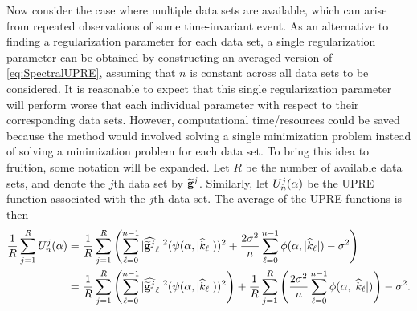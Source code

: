 Now consider the case where multiple data sets are available, which can arise from repeated observations of some time-invariant event. As an alternative to finding a regularization parameter for each data set, a single regularization parameter can be obtained by constructing an averaged version of \eqref{eq:SpectralUPRE}, assuming that $n$ is constant across all data sets to be considered. It is reasonable to expect that this single regularization parameter will perform worse that each individual parameter with respect to their corresponding data sets. However, computational time/resources could be saved because the method would involved solving a single minimization problem instead of solving a minimization problem for each data set. To bring this idea to fruition, some notation will be expanded. Let $R$ be the number of available data sets, and denote the $j$th data set by $\widetilde{\mathbf{g}}^j$. Similarly, let $U_n^j(\alpha)$ be the UPRE function associated with the $j$th data set.  The average of the UPRE functions is then 
\begin{align*}
\frac{1}{R}\sum_{j=1}^R U_n^j(\alpha) &= \frac{1}{R}\sum_{j=1}^R \left(\sum_{\ell = 0}^{n-1} |\widehat{\widetilde{\mathbf{g}}^j}_\ell|^2(\psi(\alpha,|\widehat{k}_\ell|))^2 + \frac{2\sigma^2}{n}\sum_{\ell = 0}^{n-1} \phi(\alpha,|\widehat{k}_\ell|) - \sigma^2\right) \\
&= \frac{1}{R}\sum_{j=1}^R \left(\sum_{\ell = 0}^{n-1} |\widehat{\widetilde{\mathbf{g}}^j}_\ell|^2(\psi(\alpha,|\widehat{k}_\ell|))^2\right) + \frac{1}{R}\sum_{j=1}^R \left(\frac{2\sigma^2}{n}\sum_{\ell = 0}^{n-1} \phi(\alpha,|\widehat{k}_\ell|)\right) - \sigma^2.
\end{align*}
